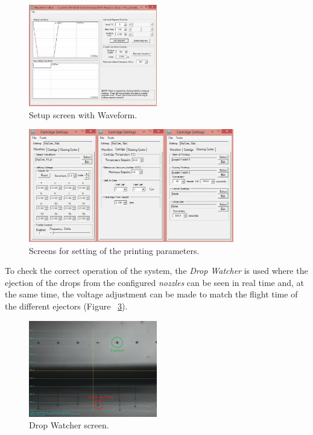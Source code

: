 \begin{figure}[H]
  \centering
    \includegraphics[width=0.5\textwidth]{Figures/Figura_Pantalla_Waveform}
  \caption{Setup screen with Waveform.}
  \label{fig:Figura_Pantalla_Waveform}
\end{figure}

\begin{figure}[H]
  \centering
    \includegraphics[width=0.8\textwidth]{Figures/Figura_Configuraciones_cartucho}
  \caption{Screens for setting of the printing parameters.}
  \label{fig:Figura_Configuraciones_cartucho}
\end{figure}

To check the correct operation of the system, the \textit{Drop Watcher} is used where the ejection of the drops from the configured \textit{nozzles} can be seen in real time and, at the same time, the voltage adjustment can be made to match the flight time of the different ejectors (Figure ~\ref{fig:Figura_drop_watcher1}).

\begin{figure}[H]
  \centering
    \includegraphics[width=0.5\textwidth]{Figures/Figura_drop_watcher1}
  \caption{Drop Watcher screen.}
  \label{fig:Figura_drop_watcher1}
\end{figure}

